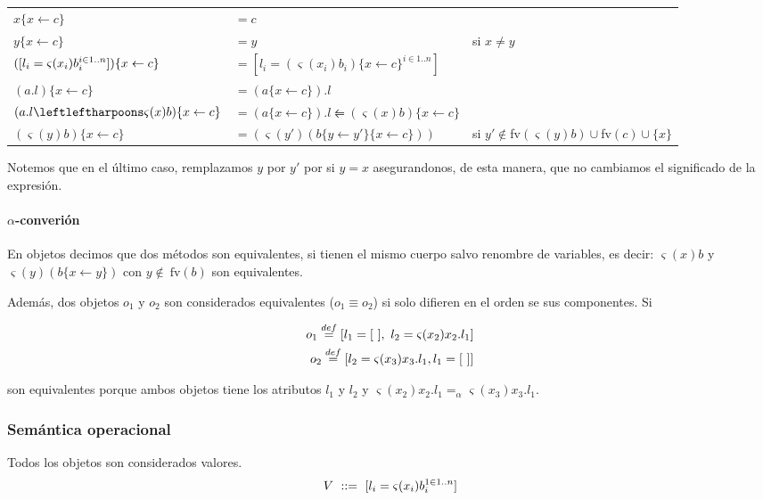 \begin{center}
\begin{tabular}{lll}
	$x\{x \leftarrow c\}$ &$= c$ & \\
	$y\{x \leftarrow c\}$ &$= y$ & si $x\neq y$\\
	$([l_i = \varsigma(x_i)b_i^{i\in 1..n}])\{x \leftarrow c\}$ &$=  [l_i = (\varsigma(x_i)b_i)\{x \leftarrow c\}^{i\in 1..n}]$ & \\
	$(a.l)\{x \leftarrow c\}$ &$= (a\{x \leftarrow c\}).l $ & \\
	$(\OORedefinicion{a.l}{x}{b})\{x \leftarrow c\}$ &$= (a\{x \leftarrow c\}).l \leftleftharpoons (\varsigma(x)b)\{x \leftarrow c\} $ & \\
	$(\varsigma(y)b)\{x \leftarrow c\}$ &$= (\varsigma(y')(b\{y \leftarrow y'\}\{x \leftarrow c\})) $ & si $y'\notin$fv$(\varsigma(y)b)\cup$fv$(c)\cup\{x\}$ \\
\end{tabular}
\end{center}

Notemos que en el último caso, remplazamos $y$ por $y'$ por si $y = x$ asegurandonos, de esta manera, que no cambiamos el significado de la expresión.

\paragraph{$\alpha$-converión} En objetos decimos que dos métodos son equivalentes, si tienen el mismo cuerpo salvo renombre de variables, es decir: $\varsigma(x)b$ y $\varsigma(y)(b\{x\leftarrow y\})$ con $y\notin~\text{fv}(b)$ son equivalentes.

Además, dos objetos $o_1$ y $o_2$ son considerados equivalentes ($o_1 \equiv o_2$) si solo difieren en el orden se sus componentes. Si 

\begin{align*}
	o_1 \overset{def}{=} [l_1 = [~],~l_2 = \varsigma(x_2)x_2.l_1] \\
	o_2 \overset{def}{=} [l_2 = \varsigma(x_3)x_3.l_1, l_1 = [~]]
\end{align*}

son equivalentes porque ambos objetos tiene los atributos $l_1$ y $l_2$ y $\varsigma(x_2) x_2.l_1 =_\alpha \varsigma(x_3) x_3.l_1$.


\subsubsection{Semántica operacional}
Todos los objetos son considerados valores.
$$V~::=~[l_i = \varsigma(x_i)b_i^{1\in 1..n}]$$

